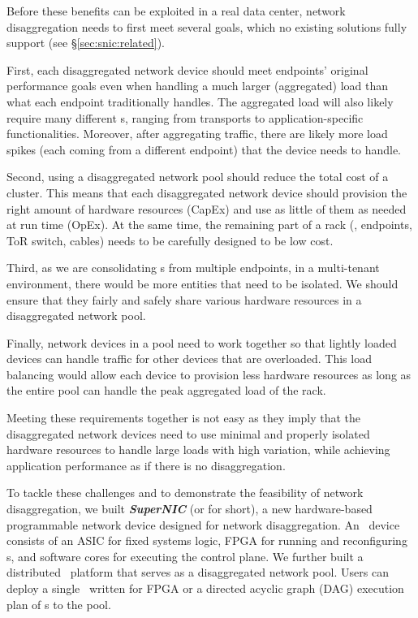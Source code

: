 Before these benefits can be exploited in a real data center, network disaggregation needs to first meet several goals, which no existing solutions fully support (see \S\ref{sec:snic:related}).



First, each disaggregated network device should meet endpoints' original performance goals even when handling a much larger (aggregated) load than what each endpoint traditionally handles.
The aggregated load will also likely require many different \nt{}s, ranging from transports to application-specific functionalities.
Moreover, after aggregating traffic, there are likely more load spikes (each coming from a different endpoint) that the device needs to handle.

Second, using a disaggregated network pool should reduce the total cost of a cluster. This means that each disaggregated network device should provision the right amount of hardware resources (CapEx) and use as little of them as needed at run time (OpEx). At the same time, the remaining part of a rack (\eg, endpoints, ToR switch, cables) needs to be carefully designed to be low cost.

Third, as we are consolidating \nt{}s from multiple endpoints, in a multi-tenant environment, there would be more entities that need to be isolated. We should ensure that they fairly and safely share various hardware resources in a disaggregated network pool. 

Finally, network devices in a pool need to work together so that lightly loaded devices can handle traffic for other devices that are overloaded.
This load balancing would allow each device to provision less hardware resources as long as the entire pool can handle the peak aggregated load of the rack.


Meeting these requirements together is not easy as they imply that the disaggregated network devices need to use minimal and properly isolated hardware resources to handle large loads with high variation, while achieving application performance as if there is no disaggregation.

To tackle these challenges and to demonstrate the feasibility of network disaggregation, we built \textit{\textbf{SuperNIC}} (or \textit{\snic} for short), a new hardware-based programmable network device designed for network disaggregation.
An \snic\ device consists of an ASIC for fixed systems logic, FPGA for running and reconfiguring \nt{}s, and software cores for executing the control plane.
We further built a distributed \snic\ platform that serves as a disaggregated network pool.
Users can deploy a single \nt\ written for FPGA or a directed acyclic graph (DAG) execution plan of \nt{}s to the pool.

